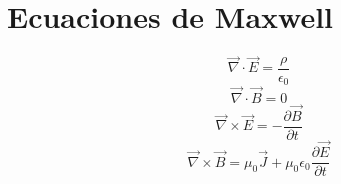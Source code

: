 \documentclass{article}
\begin{document}
\section{Ecuaciones de Maxwell}
	\begin{equation*}
		\vec{\nabla}\cdot\vec{E} = \frac{\rho}{\epsilon_0}
	\end{equation*}
	\begin{equation*}
		\vec{\nabla}\cdot\vec{B} = 0
	\end{equation*}
	\begin{equation*}
		\vec{\nabla}\times\vec{E} = -\frac{\partial\vec{B}}{\partial t}
	\end{equation*}
	\begin{equation*}
		\vec{\nabla}\times\vec{B} = \mu_0\vec{J}+\mu_0\epsilon_0\frac{\partial\vec{E}}{\partial t}
	\end{equation*}
\end{document}
